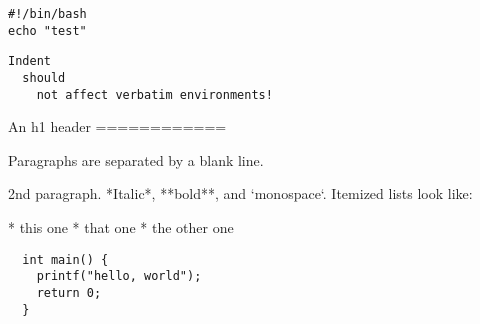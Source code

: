 \documentclass{minimal}
\begin{document}
\begin{verbatim}
#!/bin/bash
echo "test"
\end{verbatim}

\begin{lstlisting}
Indent
  should
    not affect verbatim environments!
\end{lstlisting}

\begin{markdown}
An h1 header
============

Paragraphs are separated by a blank line.

2nd paragraph.
*Italic*, **bold**, and `monospace`.
Itemized lists look like:

* this one
* that one
* the other one
\end{markdown}

\begin{verbatim}
  int main() {
    printf("hello, world");
    return 0;
  }
\end{verbatim}
\end{document}
